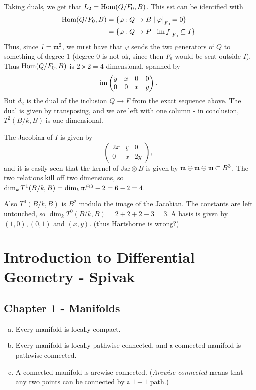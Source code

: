 \documentclass[11pt, english]{article}
\begin{document}
\begin{sol}
Taking duals, we get that $L_2 = \operatorname{Hom}(Q/F_0,B)$. This set can be identified with
\begin{align*}
\Hom(Q/F_0,B) &= \{ \varphi: Q \to B \mid \restr{\varphi}{F_0} = 0 \} \\
&= \{ \varphi: Q \to P \mid \im \restr{f}{F_0} \subseteq I \}
\end{align*}
Thus, since $I= \mathfrak{m}^2$, we must have that $\varphi$ sends the two generators of $Q$ to something of degree $1$ (degree $0$ is not ok, since then $F_0$ would be sent outside $I$). Thus $\operatorname{Hom}(Q/F_0,B)$ is $2 \times 2=4$-dimensional, spanned by 
\[
\operatorname{im} 
\begin{pmatrix}
  y & x & 0 & 0 \\
0 & 0 & x & y
\end{pmatrix}.
\]
But $d_2$ is the dual of the inclusion $Q \to F$ from the exact sequence above. The dual is given by transposing, and we are left with one column - in conclusion, $T^2(B/k,B)$ is one-dimensional.

The Jacobian of $I$ is given by
\[
\begin{pmatrix}
  2x & y & 0 \\
0 & x & 2y 
\end{pmatrix},
\]
and it is easily seen that the kernel of $\text{Jac} \otimes B$ is given by $\mathfrak{m} \oplus \mathfrak{m} \oplus \mathfrak{m} \subset B^3$. The two relations kill off two dimensions, so $\dim_k T^1(B/k,B) = \dim_k \mathfrak{m}^{\oplus 3} - 2 = 6-2=4$.

Also $T^0(B/k,B)$ is $B^2$ modulo the image of the Jacobian. The constants are left untouched, so $\dim_k T^0(B/k,B) = 2+2+2-3=3$. A basis is given by $(1,0),(0,1)$ and $(x,y)$. (thus Hartshorne is wrong?)
\end{sol}

\section{Introduction to Differential Geometry - Spivak}

\subsection{Chapter 1 - Manifolds}

\begin{exc}[Exercise 3]
  \begin{enumerate}[a)]
  \item Every manifold is locally compact.
\item Every manifold is locally pathwise connected, and a connected manifold is pathwise connected.
\item A connected manifold is arcwise connected. (\emph{Arcwise connected} means that any two points can be connected by a $1-1$ path.)
  \end{enumerate}
\end{exc}
\end{document}
